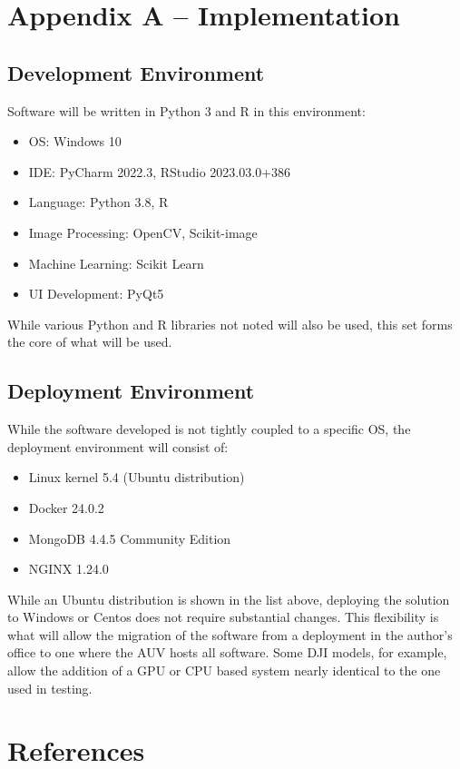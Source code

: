 \documentclass[12pt]{article}
\begin{document}
\newpage
\section{Appendix A -- Implementation}
\subsection{Development Environment}
Software will be written in Python 3 and R in this environment:

\begin{itemize}
	\item{OS: Windows 10}
	\item{IDE: PyCharm 2022.3, RStudio 2023.03.0+386}
	\item{Language: Python 3.8, R}
	\item{Image Processing: OpenCV, Scikit-image}
	\item{Machine Learning: Scikit Learn}
	\item{UI Development: PyQt5}
\end{itemize}

While various Python and R libraries not noted will also be used, this set forms the core of what will be used.

\subsection{Deployment Environment}
While the software developed is not tightly coupled to a specific OS, the deployment environment will consist of:
\begin{itemize}
	\item{Linux kernel 5.4 (Ubuntu distribution)}
	\item{Docker 24.0.2}
	\item{MongoDB 4.4.5 Community Edition}
	\item{NGINX 1.24.0}
\end{itemize}

While an Ubuntu distribution is shown in the list above, deploying the solution to Windows or Centos does not require substantial changes. This flexibility is what will allow the migration of the software from a deployment in the author's office to one where the AUV hosts all software.  Some DJI models, for example, allow the addition of a GPU or CPU based system nearly identical to the one used in testing.








\newpage
{
\section{References}
\printbibliography[heading=none]
}
\end{document}
